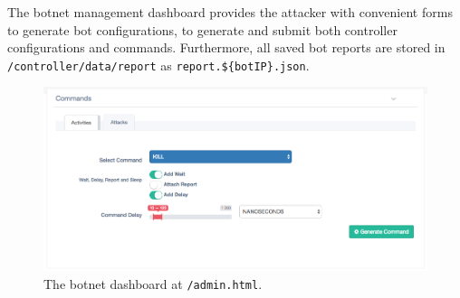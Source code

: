 The botnet management dashboard provides the attacker with convenient forms to generate bot configurations, to generate and submit both controller configurations and commands. Furthermore, all saved bot reports are stored in \texttt{/controller/data/report} as \texttt{report.\$\{botIP\}.json}.

\begin{figure}[tp]
  \centering
  \includegraphics[scale=0.2]{./fig/commandsWUI.png}
  \caption{The botnet dashboard at \texttt{/admin.html}.}
    \label{fig:controller-botnet-dashboard}
\end{figure}
